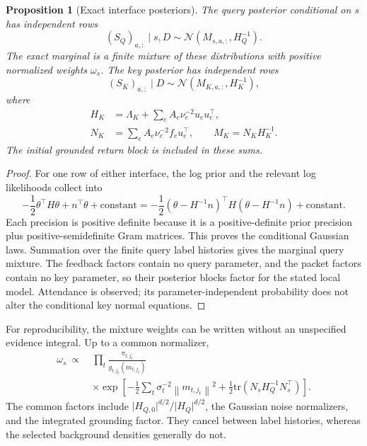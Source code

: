 \documentclass[11pt]{article}
\newtheorem{proposition}[theorem]{Proposition}
\theoremstyle{definition}
\theoremstyle{remark}
\newcommand{\N}{\mathcal N}
\newcommand{\tr}{\mathrm{tr}}
\newcommand{\SQ}{S_{Q}}
\newcommand{\SK}{S_{K}}
\newcommand{\norm}[1]{\left\lVert #1\right\rVert}
\begin{document}
\begin{proposition}[Exact interface posteriors]
The query posterior conditional on \(s\) has independent rows
\begin{equation}
(\SQ)_{a,:}\mid s,D\sim\N(M_{s,a,:},H_Q^{-1}).
\label{eq:q-component}
\end{equation}
The exact marginal is a finite mixture of these distributions with positive normalized weights \(\omega_s\). The key posterior has independent rows
\begin{equation}
(\SK)_{a,:}\mid D\sim\N(M_{K,a,:},H_K^{-1}),
\label{eq:k-posterior}
\end{equation}
where
\begin{align}
H_K&=\Lambda_K+\sum_eA_e\nu_e^{-2}u_eu_e^\top,\nonumber\\
N_K&=\sum_eA_e\nu_e^{-2}f_eu_e^\top,\qquad
M_K=N_KH_K^{-1}.
\label{eq:k-stats}
\end{align}
The initial grounded return block is included in these sums.
\end{proposition}
\begin{proof}
For one row of either interface, the log prior and the relevant log likelihoods collect into
\[
-\frac12\theta^\top H\theta+n^\top\theta+\mathrm{constant}
=
-\frac12(\theta-H^{-1}n)^\top H(\theta-H^{-1}n)
+\mathrm{constant}.
\]
Each precision is positive definite because it is a positive-definite prior precision plus positive-semidefinite Gram matrices. This proves the conditional Gaussian laws. Summation over the finite query label histories gives the marginal query mixture. The feedback factors contain no query parameter, and the packet factors contain no key parameter, so their posterior blocks factor for the stated local model. Attendance is observed; its parameter-independent probability does not alter the conditional key normal equations.
\end{proof}

For reproducibility, the mixture weights can be written without an unspecified evidence integral. Up to a common normalizer,
\begin{equation}
\begin{split}
\omega_s\ \propto\ &
\prod_t\frac{\pi_{t,j_t}}{g_{t,j_t}(m_{t,j_t})}\\
&\times\exp\left[
-\frac12\sum_t\sigma_t^{-2}\norm{m_{t,j_t}}^2
+\frac12\tr(N_sH_Q^{-1}N_s^\top)
\right].
\end{split}
\label{eq:mixture-weights}
\end{equation}
The common factors include \(\lvert H_{Q,0}\rvert^{d/2}/\lvert H_Q\rvert^{d/2}\), the Gaussian noise normalizers, and the integrated grounding factor. They cancel between label histories, whereas the selected background densities generally do not.
\end{document}
